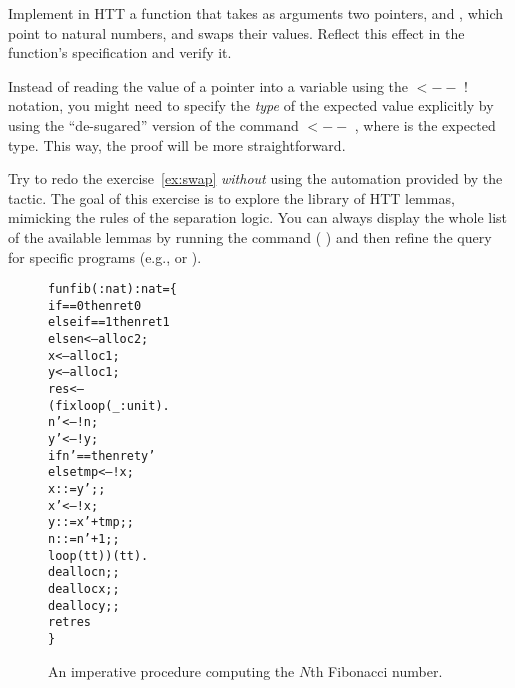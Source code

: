 \begin{exercise} \label{ex:swap}
Implement in HTT a function that takes as arguments two pointers, 
and , which point to natural numbers, and swaps their
values. Reflect this effect in the function's specification and verify
it.


\hint Instead of reading the value of a pointer into a variable 
 using the  $\mathtt{<--}$ ! notation, you might need to specify the \textit{type}
 of the expected value explicitly by using the ``de-sugared'' version of
 the command  $\mathtt{<--}$   , where  is the expected type. This
 way, the proof will be more straightforward.
\end{exercise}
\begin{coqdoccode}
\coqdocemptyline
\coqdocemptyline
\end{coqdoccode}
\begin{exercise}
Try to redo the exercise~\ref{ex:swap} \textit{without} using the
automation provided by the  tactic. The goal of this exercise
is to explore the library of HTT lemmas, mimicking the rules of the
separation logic. You can always display the whole list of the
available lemmas by running the command  \coqdocvar{\_} ( \coqdocvar{\_} \coqdocvar{\_} \coqdocvar{\_}) and
then refine the query for specific programs (e.g.,  or ).
\end{exercise}





\begin{figure}[t!]
\begin{alltt}
    fun fib ( : nat): nat = \{
      if  == 0 then ret 0
       else if  == 1 then ret 1
       else n <-- alloc 2;
            x <-- alloc 1;
            y <-- alloc 1;
            res <-- 
              (fix loop (_ : unit). 
                 n' <-- !n;
                 y' <-- !y;
                 if n' ==  then ret y'
                 else tmp <-- !x;
                      x ::= y';;
                      x' <-- !x;
                      y ::= x' + tmp;;
                      n ::= n' + 1;;
                      loop(tt))(tt).
            dealloc n;;
            dealloc x;;
            dealloc y;;
            ret res    
    \}
\end{alltt}
\caption{An imperative procedure computing the $N$th Fibonacci
number.}
\label{fig:fibcode}
\end{figure}

